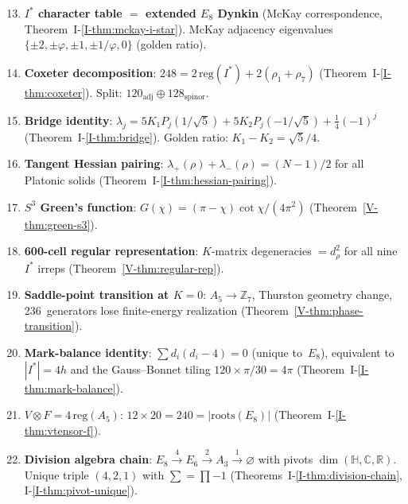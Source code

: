 \begin{enumerate}\setcounter{enumi}{12}
\item \textbf{$I^*$ character table $=$ extended $E_8$ Dynkin}
  (McKay correspondence, Theorem~I-\ref{I-thm:mckay-i-star}).
  McKay adjacency eigenvalues $\{{\pm}2, {\pm}\varphi,
  {\pm}1, {\pm}1/\varphi, 0\}$ (golden ratio).

\item \textbf{Coxeter decomposition}:
  $248 = 2\,\mathrm{reg}(I^*) + 2(\rho_1{+}\rho_7)$
  (Theorem~I-\ref{I-thm:coxeter}).
  Split: $120_{\mathrm{adj}} \oplus 128_{\mathrm{spinor}}$.

\item \textbf{Bridge identity}:
  $\lambda_j = 5K_1 P_j(1/\sqrt{5}) + 5K_2 P_j(-1/\sqrt{5})
  + \tfrac{1}{4}(-1)^j$
  (Theorem~I-\ref{I-thm:bridge}).
  Golden ratio: $K_1 - K_2 = \sqrt{5}/4$.

\item \textbf{Tangent Hessian pairing}:
  $\lambda_+(\rho) + \lambda_-(\rho) = (N{-}1)/2$ for all Platonic solids
  (Theorem~I-\ref{I-thm:hessian-pairing}).

\item \textbf{$S^3$ Green's function}:
  $G(\chi) = (\pi{-}\chi)\cot\chi/(4\pi^2)$
  (Theorem~\ref*{V-thm:green-s3}).

\item \textbf{600-cell regular representation}:
  $K$-matrix degeneracies $= d_\rho^2$ for all nine $I^*$ irreps
  (Theorem~\ref*{V-thm:regular-rep}).

\item \textbf{Saddle-point transition at $K = 0$}: $A_5 \to \mathbb{Z}_7$,
  Thurston geometry change, 236~generators lose
  finite-energy realization
  (Theorem~\ref*{V-thm:phase-transition}).

\item \textbf{Mark-balance identity}: $\sum d_i(d_i{-}4) = 0$
  (unique to~$E_8$), equivalent to $|I^*| = 4h$ and the
  Gauss--Bonnet tiling $120 \times \pi/30 = 4\pi$
  (Theorem~I-\ref{I-thm:mark-balance}).

\item \textbf{$V \otimes F = 4\,\mathrm{reg}(A_5)$}:
  $12 \times 20 = 240 = |\text{roots}(E_8)|$
  (Theorem~I-\ref{I-thm:vtensor-f}).

\item \textbf{Division algebra chain}:
  $E_8 \xrightarrow{4} E_6 \xrightarrow{2} A_3 \xrightarrow{1} \varnothing$
  with pivots $\dim(\mathbb{H}, \mathbb{C}, \mathbb{R})$.
  Unique triple $(4,2,1)$ with $\sum = \prod - 1$
  (Theorems~I-\ref{I-thm:division-chain}, I-\ref{I-thm:pivot-unique}).


\end{enumerate}

